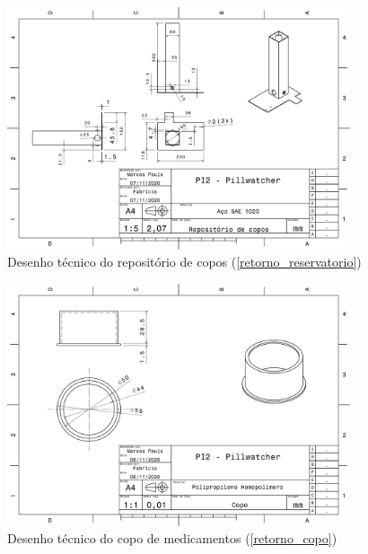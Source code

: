 \begin{apendicesenv}
\begin{figure}[H]
    \centering
    \includegraphics[width=0.9\textwidth]{figuras/estrutura/Desenhos/Reservatorio.pdf}
    \caption{Desenho técnico do repositório de copos (\ref{retorno_reservatorio})}
    \label{fig:repositorio}
\end{figure}

\begin{figure}[H]
    \centering
    \includegraphics[width=0.9\textwidth]{figuras/estrutura/Desenhos/Copo.pdf}
    \caption{Desenho técnico do copo de medicamentos (\ref{retorno_copo})}
    \label{fig:copo}
\end{figure}


\end{apendicesenv}
